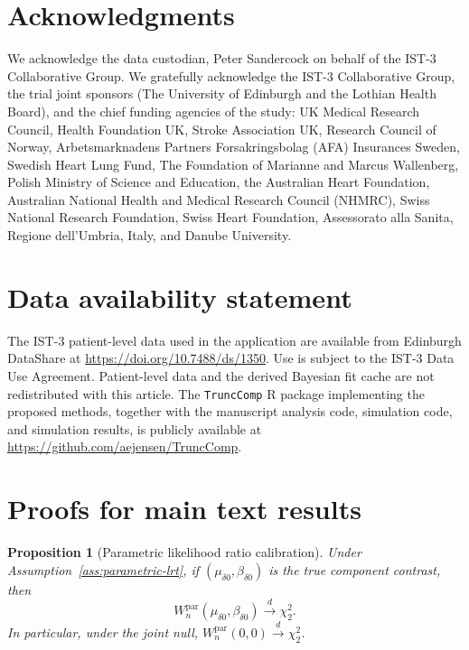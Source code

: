 \documentclass[11pt]{article}
\newtheorem{proposition}{Proposition}
\begin{document}
\section*{Acknowledgments}
We acknowledge the data custodian, Peter Sandercock on behalf of the IST-3 Collaborative Group. We gratefully acknowledge the IST-3 Collaborative Group, the trial joint sponsors (The University of Edinburgh and the Lothian Health Board), and the chief funding agencies of the study: UK Medical Research Council, Health Foundation UK, Stroke Association UK, Research Council of Norway, Arbetsmarknadens Partners Forsakringsbolag (AFA) Insurances Sweden, Swedish Heart Lung Fund, The Foundation of Marianne and Marcus Wallenberg, Polish Ministry of Science and Education, the Australian Heart Foundation, Australian National Health and Medical Research Council (NHMRC), Swiss National Research Foundation, Swiss Heart Foundation, Assessorato alla Sanita, Regione dell'Umbria, Italy, and Danube University.

\section*{Data availability statement}
The IST-3 patient-level data used in the application are available from Edinburgh DataShare at \url{https://doi.org/10.7488/ds/1350}. Use is subject to the IST-3 Data Use Agreement. Patient-level data and the derived Bayesian fit cache are not redistributed with this article. The \texttt{TruncComp} R package implementing the proposed methods, together with the manuscript analysis code, simulation code, and simulation results, is publicly available at \url{https://github.com/aejensen/TruncComp}.

\fi

\ifManuscriptIncludeSupplement
\clearpage
\appendix
\ifProofsExternal
\section{Proofs for main text results}\label{app:main-text-proofs}


\begingroup{}\renewcommand\theproposition{\ref{thm:prAtEndii}}\begin{proposition}[Parametric likelihood ratio calibration]\label {prop:parametric-lrt} Under Assumption~\ref {ass:parametric-lrt}, if $(\mu _{\delta 0},\beta _{\delta 0})$ is the true component contrast, then \[ W_n^{\mathrm {par}}(\mu _{\delta 0},\beta _{\delta 0}) \overset {d}{\longrightarrow }\chi ^2_2. \] In particular, under the joint null, $W_n^{\mathrm {par}}(0,0)\overset {d}{\longrightarrow }\chi ^2_2$.\end{proposition}\endgroup
\end{document}
